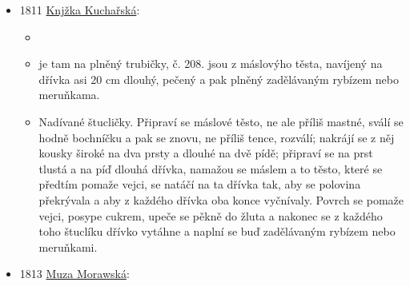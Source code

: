 \begin{itemize}
  \begin{itemize}
  \tightlist
  \item
  \item
    s. 169  38 Vaječník neb tak nazvaný volský křtán:

    \begin{itemize}
    \tightlist
    \item
      každopádně je to smaženej trdelník z překládanýho těsta
    \item
      Vezme se půl libry mouky na vál, jakož i čtvrt libry drobně
      tlučeného cukru, a tak skořice, a vmíchá do každého polovice mezy
      tu mouku, trochu se osolí, a vezme se k tomu ještě čtvrt libry
      másla, které se na plátky nebo lístky zmačká a zatím stranou
      odloží; potom se vezmou 3 žloutky, jedno celé vejce, a ostatek
      sladké smetany a zadělá na těsto, které tak tuhé být musí, jako
      máslové těsto. Když již dobře vypracované, vyválí se a to
      plátkované nebo lístkované máslo vloží se do prostřed, vyválí 2
      nebo 3kráte a zase složí jak máslové těsto; posledně se vyválí tak
      tence jak hřbet od nože, nakrájí se čtverhrané fleky tak velké,
      aby se s nimi ta k tomu vzatá formička přikrýti mohla, obváže se
      pak nití na způsob obruče, a dá se taková forma do másla nehrubě
      tuze rozpáleného, a obrací v takovém kolem a kolem; když již z
      obou stran pěkně pčervenale jest, tak se odváže niť, a to pečené
      těsto vezme ven. Na ten způsob pokračuje se, a když všechno
      upečené, posype cukrem a skořicí.
    \end{itemize}
  \end{itemize}
\item
  1811
  \href{https://ndk.cz/uuid/uuid:539b5640-f0dd-11dc-b775-000d606f5dc6}{Knjžka
  Kuchařská}:

  \begin{itemize}
  \tightlist
  \item
     
  \item
    je tam  na plněný trubičky, č. 208. jsou z
    máslovýho těsta, navíjený na dřívka asi 20 cm dlouhý, pečený a pak
    plněný zadělávaným rybízem nebo meruňkama.
  \item
    Nadívané štucličky. Připraví se máslové těsto, ne ale příliš mastné,
    sválí se hodně bochníčku a pak se znovu, ne příliš tence, rozválí;
    nakrájí se z něj kousky široké na dva prsty a dlouhé na dvě pídě;
    připraví se na prst tlustá a na píď dlouhá dřívka, namažou se máslem
    a to těsto, které se předtím pomaže vejci, se natáčí na ta dřívka
    tak, aby se polovina překrývala a aby z každého dřívka oba konce
    vyčnívaly. Povrch se pomaže vejci, posype cukrem, upeče se pěkně do
    žluta a nakonec se z každého toho štuclíku dřívko vytáhne a naplní
    se buď zadělávaným rybízem nebo meruňkami.
  \end{itemize}
\item
  1813
  \href{https://ndk.cz/view/uuid:c0247bb0-d3b5-11dc-b9b7-000d606f5dc6?page=uuid:f986d11e-aa9e-41c6-b183-52fcf3fc3f80}{Muza
  Morawská}:


\end{itemize}

